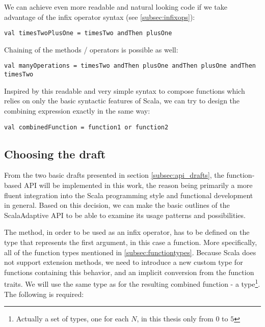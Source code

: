 We can achieve even more readable and natural looking code if we take advantage of the infix operator syntax (see \ref{subsec:infixops}):

\lstset{style=Scala}
\begin{lstlisting}
val timesTwoPlusOne = timesTwo andThen plusOne
\end{lstlisting}

Chaining of the methods / operators is possible as well:

\lstset{style=Scala}
\begin{lstlisting}
val manyOperations = timesTwo andThen plusOne andThen plusOne andThen timesTwo
\end{lstlisting}

Inspired by this readable and very simple syntax to compose functions which relies on only the basic syntactic features of Scala, we can try to design the combining expression exactly in the same way:

\lstset{style=Scala}
\begin{lstlisting}
val combinedFunction = function1 or function2
\end{lstlisting}

\subsection{Choosing the draft}

From the two basic drafts presented in section \ref{subsec:api_drafts}, the function-based API will be implemented in this work, the reason being primarily a more fluent integration into the Scala programming style and functional development in general. Based on this decision, we can make the basic outlines of the ScalaAdaptive API to be able to examine its usage patterns and possibilities.

The  method, in order to be used as an infix operator, has to be defined on the type that represents the first argument, in this case a function. More specifically, all of the function types mentioned in \ref{subsec:functiontypes}. Because Scala does not support extension methods, we need to introduce a new custom type for functions containing this behavior, and an implicit conversion from the function traits. We will use the same type as for the resulting combined function - a  type\footnote{Actually a set of types, one for each $N$, in this thesis only from $0$ to $5$}. The following is required:

